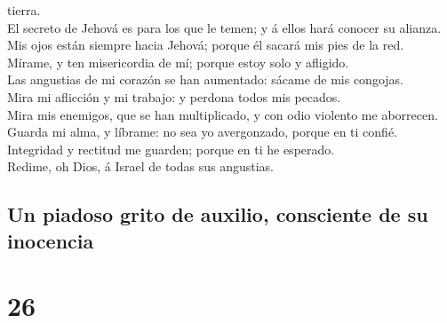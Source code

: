 tierra.\\
 El secreto de Jehová es para los que le temen; y á ellos
hará conocer su alianza.\\
 Mis ojos están siempre hacia Jehová; porque él sacará mis
pies de la red.\\
 Mírame, y ten misericordia de mí; porque estoy solo y
afligido.\\
 Las angustias de mi corazón se han aumentado: sácame de
mis congojas.\\
 Mira mi aflicción y mi trabajo: y perdona todos mis
pecados.\\
 Mira mis enemigos, que se han multiplicado, y con odio
violento me aborrecen.\\
 Guarda mi alma, y líbrame: no sea yo avergonzado, porque
en ti confié.\\
 Integridad y rectitud me guarden; porque en ti he
esperado.\\
 Redime, oh Dios, á Israel de todas sus angustias.

\hypertarget{un-piadoso-grito-de-auxilio-consciente-de-su-inocencia}{%
\subsection{Un piadoso grito de auxilio, consciente de su
inocencia}\label{un-piadoso-grito-de-auxilio-consciente-de-su-inocencia}}

\hypertarget{section-25}{%
\section{26}\label{section-25}}


